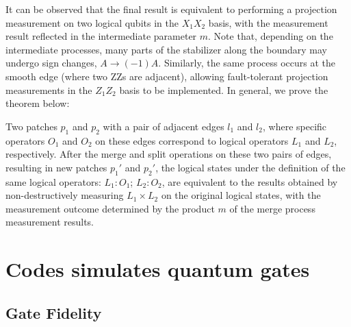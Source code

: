 \documentclass[11pt]{article}
\begin{document}
It can be observed that the final result is equivalent to performing a projection measurement on two logical qubits in the $X_1X_2$ basis, with the measurement result reflected in the intermediate parameter $m$. Note that, depending on the intermediate processes, many parts of the stabilizer along the boundary may undergo sign changes, $A \to (-1)A$. Similarly, the same process occurs at the smooth edge (where two ZZs are adjacent), allowing fault-tolerant projection measurements in the $Z_1Z_2$ basis to be implemented.
In general, we prove the theorem below:
\begin{theorem}
 Two patches $p_1$ and $p_2$ with a pair of adjacent edges $l_1$ and $l_2$, where specific operators $O_1$ and $O_2$ on these edges correspond to logical operators $L_1$ and $L_2$, respectively. After the merge and split operations on these two pairs of edges, resulting in new patches $p_1'$ and $p_2'$, the logical states under the definition of the same logical operators: $L_1:O_1$; $L_2:O_2$, are equivalent to the results obtained by non-destructively measuring $L_1 \times L_2$ on the original logical states, with the measurement outcome determined by the product $m$ of the merge process measurement results.
\end{theorem}





\appendix

\section{Codes simulates quantum gates \label{app:gate_codes}}
\subsection{Gate Fidelity\label{app:gate_fidelity}}
\end{document}
